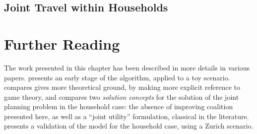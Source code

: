 {

\subsection{Joint Travel within Households}

\section{Further Reading}
The work presented in this chapter has been described in more details in various papers.
presents an early stage of the algorithm, applied to a toy scenario.
compares gives more theoretical ground,
by making more explicit reference to game theory,
and compares two \emph{solution concepts} for
the solution of the joint planning problem in the household case:
the absence of improving coalition presented here,
as well as a ``joint utility'' formulation,
classical in the literature.
presents a validation of the model for the household case,
using a Zurich scenario.

} %
